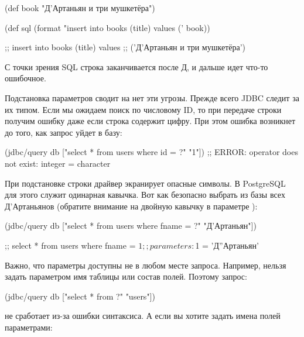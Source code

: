   \begin{clojure}
(def book "Д'Артаньян и три мушкетёра")

(def sql
  (format "insert into books (title) values ('%
          book))

;; insert into books (title) values
;; ('Д'Артаньян и три мушкетёра')
  \end{clojure}

С точки зрения SQL строка заканчивается после Д, и дальше идет что-то ошибочное.

Подстановка параметров сводит на нет эти угрозы. Прежде всего JDBC следит за их типом. Если мы ожидаем поиск по числовому ID, то при передаче строки получим ошибку даже если строка содержит цифру. При этом ошибка возникнет до того, как запрос уйдет в базу:

\begin{english}
  \begin{clojure}
(jdbc/query db ["select * from users where id = ?" "1"])
;; ERROR: operator does not exist: integer = character
  \end{clojure}
\end{english}

При подстановке строки драйвер экранирует опасные символы. В PostgreSQL для этого служит одинарная кавычка. Вот как безопасно выбрать из базы всех Д'Артаньянов (обратите внимание на двойную кавычку в параметре ):

  \begin{clojure}
(jdbc/query db
  ["select * from users where fname = ?" "Д'Артаньян"])

;; select * from users where fname = $1
;; parameters: $1 = 'Д''Артаньян'
  \end{clojure}

Важно, что параметры доступны не в любом месте запроса. Например, нельзя задать параметром имя таблицы или состав полей. Поэтому запрос:

\begin{english}
  \begin{clojure}
(jdbc/query db ["select * from ?" "users"])
  \end{clojure}
\end{english}

\noindent
не сработает из-за ошибки синтаксиса. А если вы хотите задать имена полей параметрами:

